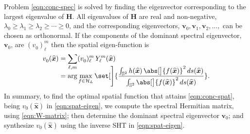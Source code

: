 \documentclass[10pt, twocolumn, twoside]{IEEEtran}
\newcommand{\untsph}{\mathbb{S}^{2}} %
\newcommand{\unit}[1]{\widehat{\bm{#1}}}
\newcommand{\dfn}{\triangleq}
\newcommand{\conj}[1]{\overline{#1}} %
\begin{document}
Problem \eqref{eqn:conc-spec} is solved by finding the eigenvector corresponding to the largest eigenvalue of $\mathbf{H}$.  All eigenvalues of $\mathbf{H}$ are real and non-negative, $\lambda_0\geq\lambda_1\geq\lambda_2\geq\dotsb\geq0$, and the corresponding eigenvectors, $\mathbf{v}_0,\mathbf{v}_1, \mathbf{v}_2, \dotsc,$ can be chosen as orthonormal.  If the components of the dominant spectral eigenvector, $\mathbf{v}_0$, are $(v^{}_0)_{\ell}^{m}$ then the spatial eigen-function is
\begin{align}
\label{eqn:spat-eigen}
	v^{}_{0}(\unit{x})
	&=\smash{\sum_{\ell,m}} (v^{}_0)_{\ell}^{m}\, Y_{\ell}^{m}(\unit{x}) \\
	&=\arg\max_{f\in\mathcal{H}_{L}}
		\set[\Bigg]{\frac{\int_{\untsph} h(\unit{x})\,\abs[\big]{f(\unit{x})}^2\,ds(\unit{x})}%
		{\int_{\untsph} \abs[\big]{f(\unit{x})}^2\,ds(\unit{x})}}. \nonumber
\end{align}
In summary, to find the optimal spatial function that attains \eqref{eqn:conc-spat}, being $v_{0}(\unit{x})$ in \eqref{eqn:spat-eigen}, we compute the spectral Hermitian matrix, using \eqref{eqn:W-matrix}; then determine the dominant spectral eigenvector $\mathbf{v}_0$; and synthesize $v_{0}(\unit{x})$ using the inverse SHT in \eqref{eqn:spat-eigen}.

%
%
\end{document}
